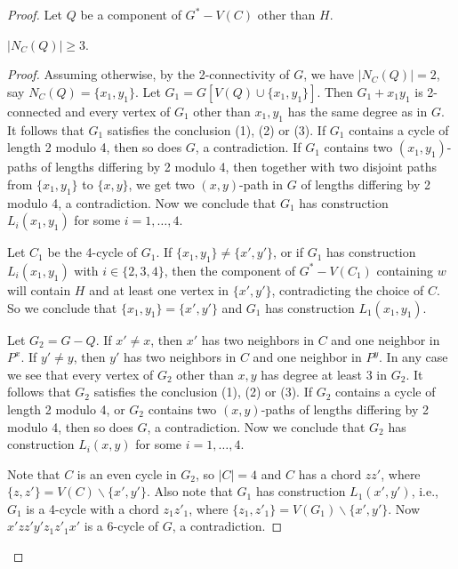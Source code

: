 \documentclass[10pt,a4paper]{amsart}
\begin{document}
\begin{proof}
    Let $Q$ be a component of $G^*-V(C)$ other than $H$.

    \begin{subclaim}\label{claim: NCQgeq3}
        $|N_C(Q)|\geqslant 3$.
    \end{subclaim}

    \begin{proof}
        Assuming otherwise, by the 2-connectivity of $G$, we have $|N_C(Q)|=2$, say $N_C(Q)=\{x_1,y_1\}$. Let $G_1=G[V(Q)\cup\{x_1,y_1\}]$. Then $G_1+x_1y_1$ is 2-connected and every vertex of $G_1$ other than $x_1,y_1$ has the same degree as in $G$. It follows that $G_1$ satisfies the conclusion (1), (2) or (3). If $G_1$ contains a cycle of length 2 modulo 4, then so does $G$, a contradiction. If $G_1$ contains two $(x_1,y_1)$-paths of lengths differing by 2 modulo 4, then together with two disjoint paths from $\{x_1,y_1\}$ to $\{x,y\}$, we get two $(x,y)$-path in $G$ of lengths differing by 2 modulo 4, a contradiction. Now we conclude that $G_1$ has construction $L_i(x_1,y_1)$ for some $i=1,\ldots,4$.

        Let $C_1$ be the 4-cycle of $G_1$. If $\{x_1,y_1\}\neq\{x',y'\}$, or if $G_1$ has construction $L_i(x_1,y_1)$ with $i\in\{2,3,4\}$, then the component of $G^*-V(C_1)$ containing $w$ will contain $H$ and at least one vertex in $\{x',y'\}$, contradicting the choice of $C$. So we conclude that $\{x_1,y_1\}=\{x',y'\}$ and $G_1$ has construction $L_1(x_1,y_1)$.

        Let $G_2=G-Q$. If $x'\neq x$, then $x'$ has two neighbors in $C$ and one neighbor in $P^x$. If $y'\neq y$, then $y'$ has two neighbors in $C$ and one neighbor in $P^y$. In any case we see that every vertex of $G_2$ other than $x,y$ has degree at least 3 in $G_2$. It follows that $G_2$ satisfies the conclusion (1), (2) or (3). If $G_2$ contains a cycle of length 2 modulo 4, or $G_2$ contains two $(x,y)$-paths of lengths differing by 2 modulo 4, then so does $G$, a contradiction. Now we conclude that $G_2$ has construction $L_i(x,y)$ for some $i=1,\ldots,4$.

        Note that $C$ is an even cycle in $G_2$, so $|C|=4$ and $C$ has a chord $zz'$, where $\{z,z'\}=V(C)\backslash\{x',y'\}$. Also note that $G_1$ has construction $L_1(x',y')$, i.e., $G_1$ is a 4-cycle with a chord $z_1z'_1$, where $\{z_1,z'_1\}=V(G_1)\backslash\{x',y'\}$. Now $x'zz'y'z_1z'_1x'$ is a 6-cycle of $G$, a contradiction. 
    \end{proof}


\end{proof}
\end{document}
